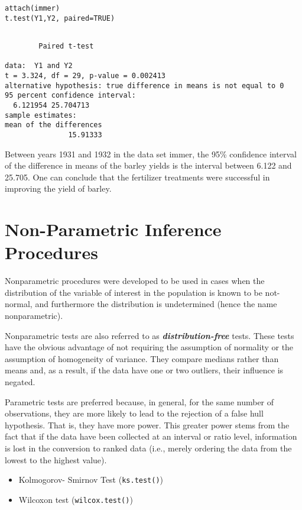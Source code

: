 \begin{framed}
\begin{verbatim}
attach(immer)
t.test(Y1,Y2, paired=TRUE)
\end{verbatim}
\end{framed}

\begin{verbatim}

        Paired t-test

data:  Y1 and Y2
t = 3.324, df = 29, p-value = 0.002413
alternative hypothesis: true difference in means is not equal to 0
95 percent confidence interval:
  6.121954 25.704713
sample estimates:
mean of the differences
               15.91333
\end{verbatim}
Between years 1931 and 1932 in the data set immer, the 95\% confidence interval of the difference in means of the barley yields is the interval between 6.122 and 25.705.
One can conclude that the fertilizer treatments were successful in improving the yield of barley.

\section{Non-Parametric Inference Procedures}
Nonparametric procedures were developed to be used in cases when the distribution of the variable of interest in the population is known to be not-normal, and furthermore the distribution is undetermined (hence the name nonparametric).

Nonparametric tests are also referred to as \textbf{\emph{distribution-free}} tests. These tests have the obvious advantage of not requiring the assumption of normality or the assumption of homogeneity of variance. They compare medians rather than means and, as a result, if the data have one or two outliers, their influence is negated.

Parametric tests are preferred because, in general, for the same number of observations, they are more likely to lead to the rejection of a false hull hypothesis. That is, they have more power. This greater power stems from the fact that if the data have been collected at an interval or ratio level, information is lost in the conversion to ranked data (i.e., merely ordering the data from the lowest to the highest value).

\begin{itemize}
\item Kolmogorov- Smirnov Test (\texttt{ks.test()})
\item Wilcoxon test (\texttt{wilcox.test()})
\end{itemize}


